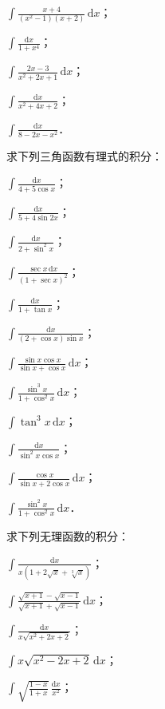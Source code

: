 \begin{xiti}
\begin{ziti}
\item $\displaystyle\int\frac{x+4}{(x^{2}-1)(x+2)}\,\mathrm{d}x$；
\item $\displaystyle\int\frac{\mathrm{d}x}{1+x^{4}}$；
\item $\displaystyle\int\frac{2x-3}{x^{2}+2x+1}\,\mathrm{d}x$；
\item $\displaystyle\int\frac{\mathrm{d}x}{x^{2}+4x+2}$；
\item $\displaystyle\int\frac{\mathrm{d}x}{8-2x-x^{2}}$．
\end{ziti}
\item 求下列三角函数有理式的积分：
\begin{ziti}
\item $\displaystyle\int\frac{\mathrm{d}x}{4+5\cos x}$；
\item $\displaystyle\int\frac{\mathrm{d}x}{5+4\sin 2x}$；
\item $\displaystyle\int\frac{\mathrm{d}x}{2+\sin^{2}x}$；
\item $\displaystyle\int\frac{\sec x\,\mathrm{d}x}{(1+\sec x)^{2}}$；
\item $\displaystyle\int\frac{\mathrm{d}x}{1+\tan x}$；
\item $\displaystyle\int\frac{\mathrm{d}x}{(2+\cos x)\sin x}$；
\item $\displaystyle\int\frac{\sin x\cos x}{\sin x+\cos x}\,\mathrm{d}x$；
\item $\displaystyle\int\frac{\sin^{3}x}{1+\cos^{2}x}\,\mathrm{d}x$；
\item $\displaystyle\int\tan^{3}x\,\mathrm{d}x$；
\item $\displaystyle\int\frac{\mathrm{d}x}{\sin^{2}x\cos x}$；
\item $\displaystyle\int\frac{\cos x}{\sin x+2\cos x}\,\mathrm{d}x$；
\item $\displaystyle\int\frac{\sin^{2}x}{1+\cos^{2}x}\,\mathrm{d}x$．
\end{ziti}
\item 求下列无理函数的积分：
\begin{ziti}
\item $\displaystyle\int\frac{\mathrm{d}x}{x(1+2\sqrt{x}+\sqrt[3]{x})}$；
\item $\displaystyle\int\frac{\sqrt{x+1}-\sqrt{x-1}}{\sqrt{x+1}+\sqrt{x-1}}\,\mathrm{d}x$；
\item $\displaystyle\int\frac{\mathrm{d}x}{x\sqrt{x^{2}+2x+2}}$；
\item $\displaystyle\int x\sqrt{x^{2}-2x+2}\,\mathrm{d}x$；
\item $\displaystyle\int\sqrt{\frac{1-x}{1+x}}\,\frac{\mathrm{d}x}{x^{2}}$；

\end{ziti}
\end{xiti}
